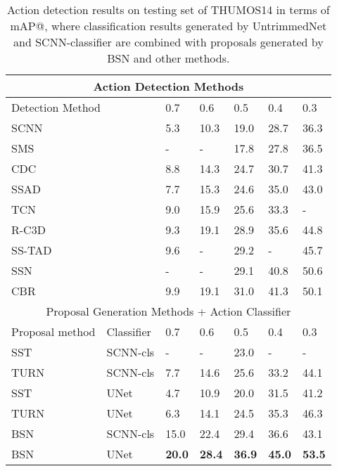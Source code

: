 \documentclass[runningheads]{llncs}
\begin{document}
\begin{table}[tbp]
\setlength{\abovecaptionskip}{0.1cm} \setlength{\belowcaptionskip}{-0.3cm} \centering
\caption{Action detection results on testing set of THUMOS14 in terms of mAP@, where classification results generated by UntrimmedNet \cite{wang2017untrimmednets} and  SCNN-classifier \cite{shou2016action} are combined with proposals generated by BSN and other  methods. }

\begin{tabular}{p{2.4cm}p{1.6cm}p{1.2cm}<{\centering}p{1.2cm}<{\centering}p{1.2cm}<{\centering}p{1.2cm}<{\centering}p{1.2cm}<{\centering}}
\toprule
\multicolumn{7}{c}{  Action Detection Methods }  \\
\hline
\multicolumn{2}{l}{  Detection Method } & 0.7 & 0.6 & 0.5 & 0.4 & 0.3  \\
\hline  
\multicolumn{2}{l}{  SCNN \cite{shou2016action} } & 5.3 & 10.3 &  19.0 & 28.7 & 36.3 \\
\multicolumn{2}{l}{  SMS \cite{yuan2017temporal} } & - & - & 17.8 &  27.8 &  36.5 \\
\multicolumn{2}{l}{  CDC \cite{shou2017cdc} } & 8.8 & 14.3 &  24.7 & 30.7 & 41.3  \\
\multicolumn{2}{l}{  SSAD \cite{ssad} } & 7.7 & 15.3 & 24.6 &  35.0 &  43.0 \\
\multicolumn{2}{l}{  TCN \cite{dai2017temporal} } & 9.0 & 15.9 & 25.6 &  33.3 &  - \\
\multicolumn{2}{l}{  R-C3D \cite{xu2017r} } & 9.3 & 19.1 &  28.9 & 35.6 & 44.8 \\
\multicolumn{2}{l}{  SS-TAD \cite{sstad} } & 9.6 & - &  29.2 & - & 45.7 \\
\multicolumn{2}{l}{  SSN  \cite{xiong2017pursuit} } & - & - & 29.1 & 40.8 & 50.6 \\
\multicolumn{2}{l}{  CBR \cite{gao2017cascaded} } & 9.9 & 19.1 &  31.0 & 41.3 & 50.1 \\
\hline 
\multicolumn{7}{c}{   Proposal Generation Methods + Action Classifier }  \\
\hline
Proposal method & Classifier & 0.7 & 0.6 & 0.5 & 0.4 & 0.3  \\
\hline
SST \cite{sst_buch_cvpr17} & SCNN-cls 	& - & - & 23.0 & - &  -\\
TURN \cite{gao2017turn} & SCNN-cls 		& 7.7 & 14.6 & 25.6 & 33.2 &  44.1\\
SST \cite{sst_buch_cvpr17} & UNet 		& 4.7 & 10.9 & 20.0 & 31.5 &  41.2\\
TURN \cite{gao2017turn} & UNet 			& 6.3 & 14.1 & 24.5 & 35.3 &  46.3\\
\hline
BSN & SCNN-cls & 15.0 & 22.4 & 29.4 & 36.6 &   43.1\\
BSN & UNet & {\bf 20.0} & {\bf 28.4} & {\bf 36.9} & {\bf 45.0} &  {\bf 53.5}\\
\bottomrule
\end{tabular}
\label{table_detection_thumos}
\normalsize
\end{table}
\end{document}
